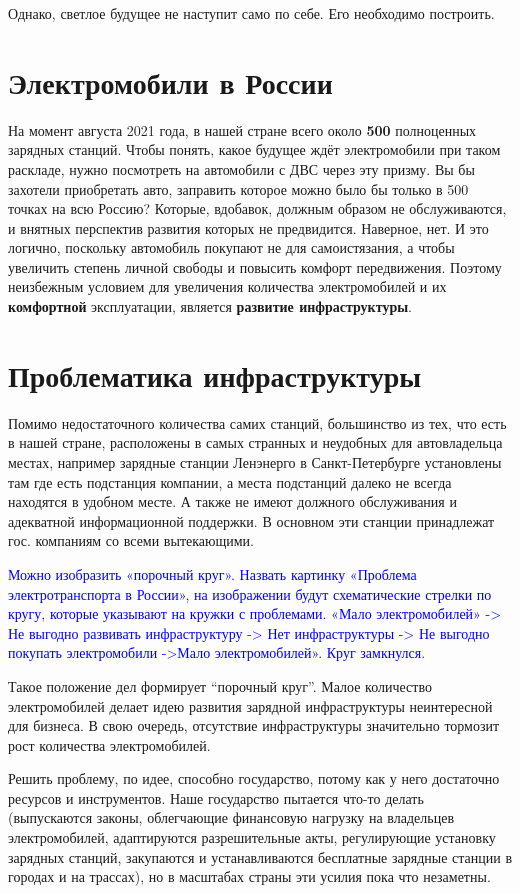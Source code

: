 \documentclass[a4paper,12pt]{report}
\begin{document}
Однако, светлое будущее не наступит само по себе. Его необходимо построить. 

\section{Электромобили в России}
На момент августа 2021 года, в нашей стране всего около \textbf{500} полноценных зарядных станций. Чтобы понять, какое будущее ждёт электромобили при таком раскладе, нужно посмотреть на автомобили с ДВС через эту призму. Вы бы захотели приобретать авто, заправить которое можно было бы только в 500 точках на всю Россию? Которые, вдобавок, должным образом не обслуживаются, и внятных перспектив развития которых не предвидится. Наверное, нет. И это логично, поскольку автомобиль покупают не для самоистязания, а чтобы увеличить степень личной свободы и повысить комфорт передвижения. Поэтому неизбежным условием для увеличения количества электромобилей и их \textbf{комфортной} эксплуатации, является \textbf{развитие инфраструктуры}. 

\section{Проблематика инфраструктуры}
Помимо недостаточного количества самих станций, большинство из тех, что есть в нашей стране, расположены в самых странных и неудобных для автовладельца местах, например зарядные станции Ленэнерго в Санкт-Петербурге установлены там где есть подстанция компании, а места подстанций далеко не всегда находятся в удобном месте. А также не имеют должного обслуживания и адекватной информационной поддержки. В основном эти станции принадлежат гос. компаниям со всеми вытекающими.

\textcolor{blue}{
	Можно изобразить «порочный круг». Назвать картинку «Проблема электротранспорта в России», на изображении будут схематические стрелки по кругу, которые указывают на кружки с проблемами. «Мало электромобилей» -> Не выгодно развивать инфраструктуру -> Нет инфраструктуры -> Не выгодно покупать электромобили ->Мало электромобилей». Круг замкнулся. }

Такое положение дел формирует “порочный круг”. Малое количество электромобилей делает идею развития зарядной инфраструктуры неинтересной для бизнеса. В свою очередь, отсутствие инфраструктуры значительно тормозит рост количества электромобилей. 

Решить проблему, по идее, способно государство, потому как у него достаточно ресурсов и инструментов. Наше государство пытается что-то делать (выпускаются законы, облегчающие финансовую нагрузку на владельцев электромобилей, адаптируются разрешительные акты, регулирующие установку зарядных станций, закупаются и устанавливаются бесплатные зарядные станции в городах и на трассах), но в масштабах страны эти усилия пока что незаметны. 
\end{document}
